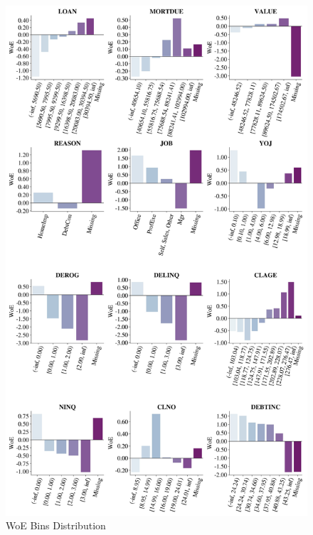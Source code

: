 \begin{figure}[H]
    \centering
    \caption{WoE Bins Distribution}\vspace{0.5em}
    \label{fig:woedist}
    \includegraphics[width=140mm]{Figures/WoE_Distribution.jpg}
    
    \vspace{-1em}
\end{figure}



